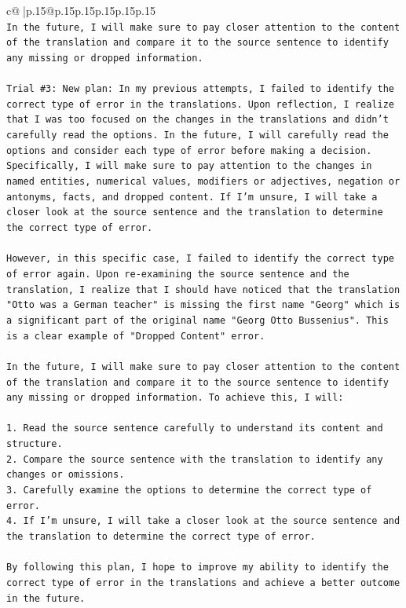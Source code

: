 \documentclass{article}
\begin{document}
{\begin{supertabular}{c@{$\;$}|p{.15\linewidth}@{}p{.15\linewidth}p{.15\linewidth}p{.15\linewidth}p{.15\linewidth}p{.15\linewidth}}
{{{\\ 
\texttt{In the future, I will make sure to pay closer attention to the content of the translation and compare it to the source sentence to identify any missing or dropped information.} \\
\\ 
\texttt{Trial \#3: New plan: In my previous attempts, I failed to identify the correct type of error in the translations. Upon reflection, I realize that I was too focused on the changes in the translations and didn't carefully read the options. In the future, I will carefully read the options and consider each type of error before making a decision. Specifically, I will make sure to pay attention to the changes in named entities, numerical values, modifiers or adjectives, negation or antonyms, facts, and dropped content. If I'm unsure, I will take a closer look at the source sentence and the translation to determine the correct type of error.} \\
\\ 
\texttt{However, in this specific case, I failed to identify the correct type of error again. Upon re{-}examining the source sentence and the translation, I realize that I should have noticed that the translation "Otto was a German teacher" is missing the first name "Georg" which is a significant part of the original name "Georg Otto Bussenius". This is a clear example of "Dropped Content" error.} \\
\\ 
\texttt{In the future, I will make sure to pay closer attention to the content of the translation and compare it to the source sentence to identify any missing or dropped information. To achieve this, I will:} \\
\\ 
\texttt{1. Read the source sentence carefully to understand its content and structure.} \\
\texttt{2. Compare the source sentence with the translation to identify any changes or omissions.} \\
\texttt{3. Carefully examine the options to determine the correct type of error.} \\
\texttt{4. If I'm unsure, I will take a closer look at the source sentence and the translation to determine the correct type of error.} \\
\\ 
\texttt{By following this plan, I hope to improve my ability to identify the correct type of error in the translations and achieve a better outcome in the future.} \\
}}}
\end{supertabular}}
\end{document}
